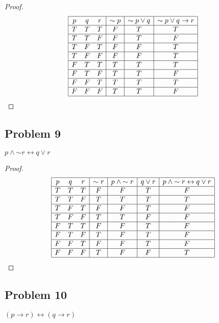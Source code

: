 \documentclass[14pt]{extarticle}
\newcommand{\bic}{\leftrightarrow}
\begin{document}
\begin{proof}
$$
\begin{array}{|ccc|c|c|c|}
\hline
p & q & r & {\sim p} & {\sim p} \vee q & {\sim p} \vee q \to r \\
\hline
T & T & T & F & T & T \\
\hline
T & T & F & F & T & F \\
\hline
T & F & T & F & F & T \\
\hline
T & F & F & F & F & T \\
\hline
F & T & T & T & T & T \\
\hline
F & T & F & T & T & F \\
\hline
F & F & T & T & T & T \\
\hline
F & F & F & T & T & F \\
\hline
\end{array}
$$
\end{proof}

\subsection{Problem 9}
$p \wedge {\sim r} \bic q \vee r$

\begin{proof}
$$
\begin{array}{|ccc|c|c|c|c|}
\hline
p & q & r & {\sim r} & p \wedge {\sim r} & q \vee r & p \wedge {\sim r} \bic q \vee r \\
\hline
T & T & T & F & F & T & F \\
\hline
T & T & F & T & T & T & T \\
\hline
T & F & T & F & F & T & F \\
\hline
T & F & F & T & T & F & F \\
\hline
F & T & T & F & F & T & F \\
\hline
F & T & F & T & F & T & F \\
\hline
F & F & T & F & F & T & F \\
\hline
F & F & F & T & F & F & T \\
\hline
\end{array}
$$
\end{proof}

\subsection{Problem 10}
$(p \to r) \bic (q \to r)$
\end{document}

